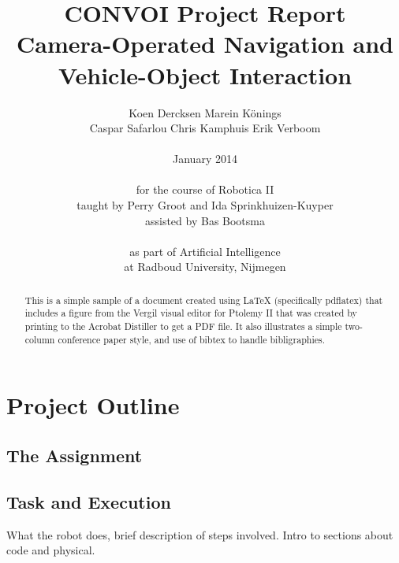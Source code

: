 \documentclass[10pt,twocolumn]{scrartcl}
\begin{document}
\title{CONVOI Project Report \\ \vspace{.5em} \normalsize{Camera-Operated Navigation and Vehicle-Object Interaction} }

\author{Koen Dercksen \hspace{2em} Marein K\"onings\\
Caspar Safarlou \hspace{2em} Chris Kamphuis \hspace{2em} Erik Verboom\\
\\
January 2014 \\
\\
for the course of Robotica II\\
taught by Perry Groot and Ida Sprinkhuizen-Kuyper\\
assisted by Bas Bootsma \\
\\
as part of Artificial Intelligence\\
at Radboud University, Nijmegen
}

\maketitle
\thispagestyle{empty} %

\begin{abstract}
   This is a simple sample of a document created using \LaTeX
   (specifically pdflatex)
   that includes a figure from the Vergil visual editor for Ptolemy II
   that was created by printing to the Acrobat Distiller to get a PDF file.
   It also illustrates a simple two-column conference paper style,
   and use of bibtex to handle bibligraphies.
\end{abstract}

\tableofcontents

\section{Project Outline}

\subsection{The Assignment}

\subsection{Task and Execution}
What the robot does, brief description of steps involved. Intro to sections about code and physical.
\end{document}
